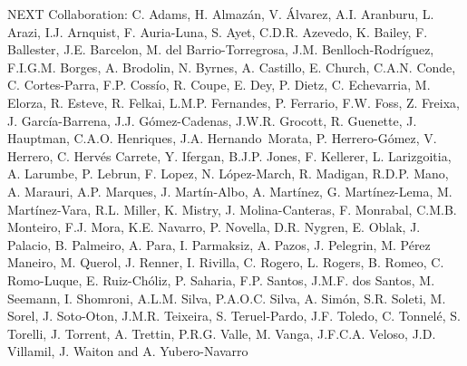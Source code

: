 NEXT Collaboration: C. Adams, H. Almaz\'an, V. \'Alvarez, A.I. Aranburu, L. Arazi, I.J. Arnquist, F. Auria-Luna, S. Ayet, C.D.R. Azevedo, K. Bailey, F. Ballester, J.E. Barcelon, M. del Barrio-Torregrosa, J.M. Benlloch-Rodr\'{i}guez, F.I.G.M. Borges, A. Brodolin, N. Byrnes, A. Castillo, E. Church, C.A.N. Conde, C. Cortes-Parra, F.P. Coss\'io, R. Coupe, E. Dey, P. Dietz, C. Echevarria, M. Elorza, R. Esteve, R. Felkai, L.M.P. Fernandes, P. Ferrario, F.W. Foss, Z. Freixa, J. Garc\'ia-Barrena, J.J. G\'omez-Cadenas, J.W.R. Grocott, R. Guenette, J. Hauptman, C.A.O. Henriques, J.A. Hernando~Morata, P. Herrero-G\'omez, V. Herrero, C. Herv\'es Carrete, Y. Ifergan, B.J.P. Jones, F. Kellerer, L. Larizgoitia, A. Larumbe, P. Lebrun, F. Lopez, N. L\'opez-March, R. Madigan, R.D.P. Mano, A. Marauri, A.P. Marques, J. Mart\'in-Albo, A. Mart\'inez, G. Mart\'inez-Lema, M. Mart\'inez-Vara, R.L. Miller, K. Mistry, J. Molina-Canteras, F. Monrabal, C.M.B. Monteiro, F.J. Mora, K.E. Navarro, P. Novella, D.R. Nygren, E. Oblak, J. Palacio, B. Palmeiro, A. Para, I. Parmaksiz, A. Pazos, J. Pelegrin, M. P\'erez Maneiro, M. Querol, J. Renner, I. Rivilla, C. Rogero, L. Rogers, B. Romeo, C. Romo-Luque, E. Ruiz-Ch\'oliz, P. Saharia, F.P. Santos, J.M.F. dos Santos, M. Seemann, I. Shomroni, A.L.M. Silva, P.A.O.C. Silva, A. Sim\'on, S.R. Soleti, M. Sorel, J. Soto-Oton, J.M.R. Teixeira, S. Teruel-Pardo, J.F. Toledo, C. Tonnel\'e, S. Torelli, J. Torrent, A. Trettin, P.R.G. Valle, M. Vanga, J.F.C.A. Veloso, J.D. Villamil, J. Waiton and A. Yubero-Navarro